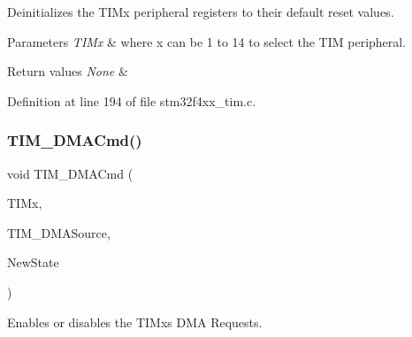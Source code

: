 Deinitializes the T\+I\+Mx peripheral registers to their default reset values. 


\begin{DoxyParams}{Parameters}
{\em T\+I\+Mx} & where x can be 1 to 14 to select the T\+IM peripheral. \\
\hline
\end{DoxyParams}

\begin{DoxyRetVals}{Return values}
{\em None} & \\
\hline
\end{DoxyRetVals}


Definition at line 194 of file stm32f4xx\+\_\+tim.\+c.

\mbox{\label{group___t_i_m_ga24700389cfa3ea9b42234933b23f1399}} 
\subsubsection{\texorpdfstring{T\+I\+M\+\_\+\+D\+M\+A\+Cmd()}{TIM\_DMACmd()}}
{\footnotesize\ttfamily void T\+I\+M\+\_\+\+D\+M\+A\+Cmd (\begin{DoxyParamCaption}\item[{\hyperlink{struct_t_i_m___type_def}{T\+I\+M\+\_\+\+Type\+Def} $\ast$}]{T\+I\+Mx,  }\item[{uint16\+\_\+t}]{T\+I\+M\+\_\+\+D\+M\+A\+Source,  }\item[{Functional\+State}]{New\+State }\end{DoxyParamCaption})}



Enables or disables the T\+I\+Mx\textquotesingle{}s D\+MA Requests. 


